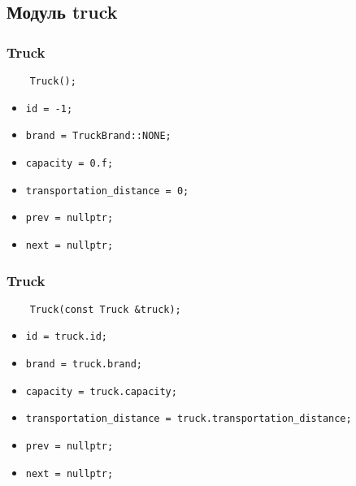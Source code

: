 \subsection{Модуль truck}

\subsubsection{Truck}

\begin{lstlisting}
    Truck();
\end{lstlisting}

\begin{itemize}
    \item \verb|id = -1;|
    \item \verb|brand = TruckBrand::NONE;|
    \item \verb|capacity = 0.f;|
    \item \verb|transportation_distance = 0;|
    \item \verb|prev = nullptr;|
    \item \verb|next = nullptr;|
\end{itemize}

\subsubsection{Truck}

\begin{lstlisting}
    Truck(const Truck &truck);
\end{lstlisting}

\begin{itemize}
    \item \verb|id = truck.id;|
    \item \verb|brand = truck.brand;|
    \item \verb|capacity = truck.capacity;|
    \item \verb|transportation_distance = truck.transportation_distance;|
    \item \verb|prev = nullptr;|
    \item \verb|next = nullptr;|
\end{itemize}

